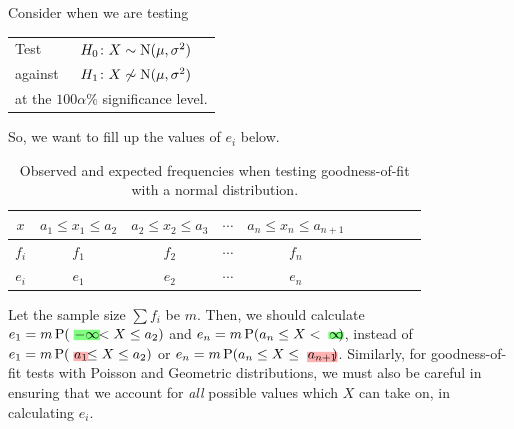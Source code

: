 \documentclass[../Notes.tex]{subfiles}
\begin{document}
\begin{note}
  Consider when we are testing 
\begin{center}
    \begin{tabular}{|ll|}
      \hline
      Test & \(H_0\colon X\sim\operatorname{N}(\mu,\sigma^2)\)\\
      against &\(H_1\colon X\not\sim\operatorname{N}(\mu,\sigma^2)\)\\
      \multicolumn{2}{|l|}{at the \(100\alpha\%\) significance level.}\\
      \hline
    \end{tabular} 
\end{center}
So, we want to fill up the values of \(e_i\) below.
\begin{table}[H]
  \centering
  \begin{tabular}{|Sc|Sc|Sc|Sc|Sc|}
    \hline
    \(x\) & \(a_1\leq x_1\leq a_2\) & \(a_2\leq x_2\leq a_3\) & \(\cdots\) & \(a_n\leq x_n\leq a_{n+1}\)\\
    \hline
    \(f_i\) & \(f_1\) & \(f_2\) & \(\cdots\) & \(f_n\)\\
    \hline
    \(e_i\) &  \(e_1\) & \(e_2\) & \(\cdots\) &  \(e_n\)\\
    \hline
  \end{tabular}
  \caption{Observed and expected frequencies when testing goodness-of-fit with a normal distribution.}
  \label{table:gof-normal} 
\end{table}
Let the sample size \(\sum f_i\) be \(m\). Then, we should calculate \(e_1=m\Prob(\highlight[green!50]{-\infty}<X\leq a_2)\) and \(e_n=m\Prob(a_n\leq X<\highlight[green!50]{\infty})\), instead of \(e_1=m\Prob(\highlight[red!30]{a_1}\leq X\leq a_2)\) or \(e_n=m\Prob(a_n\leq X\leq\highlight[red!30]{a_{n+1}})\). Similarly, for goodness-of-fit tests with Poisson and Geometric distributions, we must also be careful in ensuring that we account for \emph{all} possible values which \(X\) can take on, in calculating \(e_i\).
\end{note}
\end{document}
